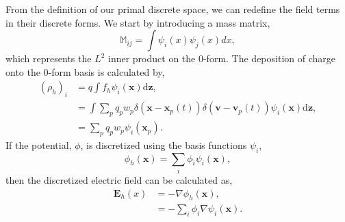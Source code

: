 \documentclass[preprint,12pt]{elsarticle}
\theoremstyle{definition}
\begin{document}
From the definition of our primal discrete space, we can redefine the field terms in their discrete forms. We start by introducing a mass matrix,
\begin{equation}
    \mathbb{M}_{ij}=\int \psi_i(x) \psi_j(x) dx,
\end{equation}
which represents the $L^2$ inner product on the 0-form. The deposition of charge onto the 0-form basis is calculated by,
\begin{align}
    (\rho_h)_i &= q \int f_h \psi_i (\mathbf{x}) \mathrm{d} \boldsymbol{z}, \\
    &= \int \sum_p q_p w_p \delta (\boldsymbol{x} - \boldsymbol{x}_p(t)) \delta (\boldsymbol{v} - \boldsymbol{v}_p(t)) \psi_i (\boldsymbol{x}) \mathrm{d} \boldsymbol{z}, \\
    &= \sum_p q_p w_p \psi_i (\mathbf{x}_p).
\end{align}
If the potential, $\phi$, is discretized using the basis functions $\psi_i$,
\begin{equation}
    \phi_h (\mathbf{x}) = \sum_{i} \phi_i \psi_i (\mathbf{x}),
\end{equation}
then the discretized electric field can be calculated as,
\begin{align}\label{eq:discEfield}
    \boldsymbol{E}_h(x) &= -\nabla \phi_h (\mathbf{x}), \\
    &= - \sum_{i} \phi_i \nabla \psi_i (\mathbf{x}).
\end{align}
\end{document}
